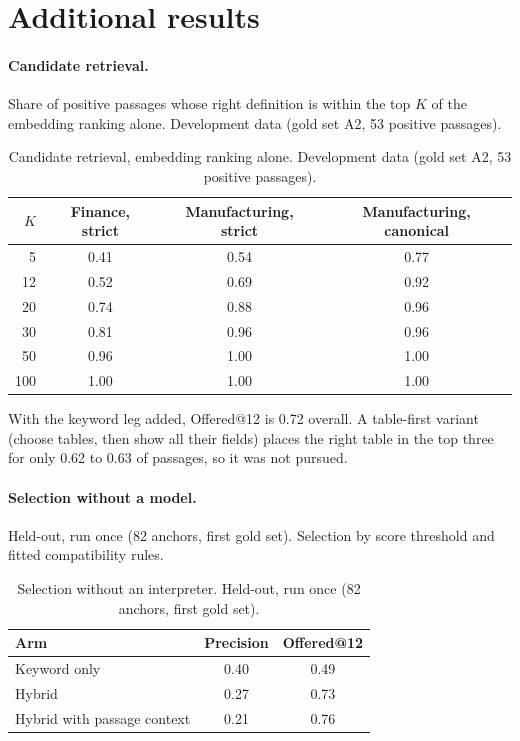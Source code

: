 \documentclass[11pt,a4paper]{article}
\begin{document}
\section{Additional results}\label{sec:extra}
\paragraph{Candidate retrieval.} Share of positive passages whose right definition is within the top $K$ of the embedding ranking alone. Development data (gold set A2, 53 positive passages).
\begin{table}[H]
\centering\small
\caption{Candidate retrieval, embedding ranking alone. Development data (gold set A2, 53 positive passages).}
\label{tab:retrieval}
\begin{tabular}{rccc}
\toprule
$K$ & Finance, strict & Manufacturing, strict & Manufacturing, canonical\\\midrule
5 & 0.41 & 0.54 & 0.77\\
12 & 0.52 & 0.69 & 0.92\\
20 & 0.74 & 0.88 & 0.96\\
30 & 0.81 & 0.96 & 0.96\\
50 & 0.96 & 1.00 & 1.00\\
100 & 1.00 & 1.00 & 1.00\\
\bottomrule
\end{tabular}
\end{table}

With the keyword leg added, Offered@12 is 0.72 overall. A table-first variant (choose tables, then show all their fields) places the right table in the top three for only 0.62 to 0.63 of passages, so it was not pursued.

\paragraph{Selection without a model.} Held-out, run once (82 anchors, first gold set). Selection by score threshold and fitted compatibility rules.
\begin{table}[H]
\centering\small
\caption{Selection without an interpreter. Held-out, run once (82 anchors, first gold set).}
\label{tab:nointerp}
\begin{tabular}{lcc}
\toprule
Arm & Precision & Offered@12\\\midrule
Keyword only & 0.40 & 0.49\\
Hybrid & 0.27 & 0.73\\
Hybrid with passage context & 0.21 & 0.76\\
\bottomrule
\end{tabular}
\end{table}
\end{document}
